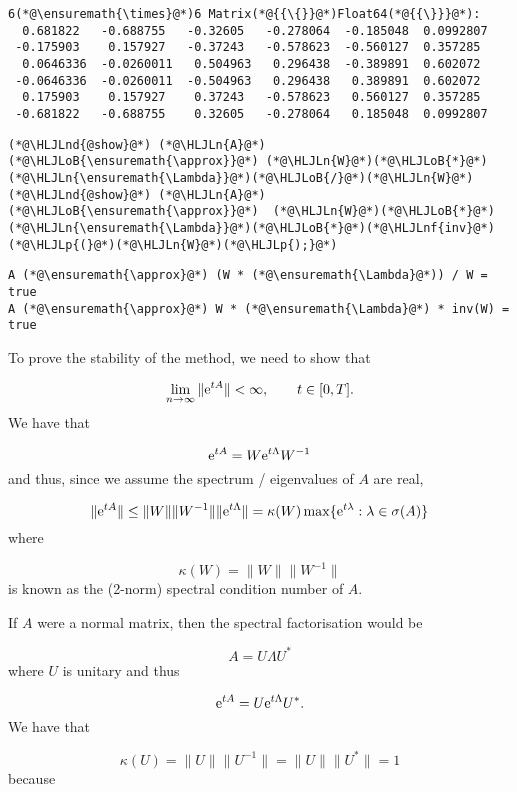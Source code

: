 \documentclass[12pt,landscape]{article}
\newcommand{\HLJLn}[1]{#1}
\newcommand{\HLJLnd}[1]{\textcolor[RGB]{214,102,97}{#1}}
\newcommand{\HLJLnf}[1]{\textcolor[RGB]{66,102,213}{#1}}
\newcommand{\HLJLoB}[1]{\textcolor[RGB]{102,102,102}{\textbf{#1}}}
\newcommand{\HLJLp}[1]{#1}
\begin{document}
{\begin{lstlisting}
6(*@\ensuremath{\times}@*)6 Matrix(*@{{\{}}@*)Float64(*@{{\}}}@*):
  0.681822   -0.688755   -0.32605   -0.278064  -0.185048  0.0992807
 -0.175903    0.157927   -0.37243   -0.578623  -0.560127  0.357285
  0.0646336  -0.0260011   0.504963   0.296438  -0.389891  0.602072
 -0.0646336  -0.0260011  -0.504963   0.296438   0.389891  0.602072
  0.175903    0.157927    0.37243   -0.578623   0.560127  0.357285
 -0.681822   -0.688755    0.32605   -0.278064   0.185048  0.0992807
\end{lstlisting}


\begin{lstlisting}
(*@\HLJLnd{@show}@*) (*@\HLJLn{A}@*) (*@\HLJLoB{\ensuremath{\approx}}@*) (*@\HLJLn{W}@*)(*@\HLJLoB{*}@*)(*@\HLJLn{\ensuremath{\Lambda}}@*)(*@\HLJLoB{/}@*)(*@\HLJLn{W}@*)
(*@\HLJLnd{@show}@*) (*@\HLJLn{A}@*) (*@\HLJLoB{\ensuremath{\approx}}@*)  (*@\HLJLn{W}@*)(*@\HLJLoB{*}@*)(*@\HLJLn{\ensuremath{\Lambda}}@*)(*@\HLJLoB{*}@*)(*@\HLJLnf{inv}@*)(*@\HLJLp{(}@*)(*@\HLJLn{W}@*)(*@\HLJLp{);}@*)
\end{lstlisting}

\begin{lstlisting}
A (*@\ensuremath{\approx}@*) (W * (*@\ensuremath{\Lambda}@*)) / W = true
A (*@\ensuremath{\approx}@*) W * (*@\ensuremath{\Lambda}@*) * inv(W) = true
\end{lstlisting}


To prove the stability of the method, we need to show that

\[
\lim_{n \to \infty}\| {\rm e}^{tA} \| < \infty, \qquad t \in [0, T].
\]
We have that

\[
{\rm e}^{tA} = W{\rm e}^{t\Lambda}W^{-1}
\]
and thus, since we assume the spectrum / eigenvalues of $A$ are real,

\[
\| {\rm e}^{tA} \| \leq \| W \| \| W^{-1} \| \| {\rm e}^{t\Lambda} \| = \kappa(W)\max\lbrace {\rm e}^{t\lambda} : \lambda \in \sigma(A)  \rbrace
\]
where

\[
\kappa(W) = \| W \| \| W^{-1} \|
\]
is known as the (2-norm) spectral condition number of $A$.  

If $A$ were a normal matrix, then the spectral factorisation would be

\[
A = U\Lambda U^*
\]
where $U$ is unitary and thus

\[
{\rm e}^{tA} = U{\rm e}^{t\Lambda}U^*.
\]
We have that

\[
\kappa(U) = \| U \| \| U^{-1} \| = \| U \| \| U^* \| = 1
\]
because

}
\end{document}
